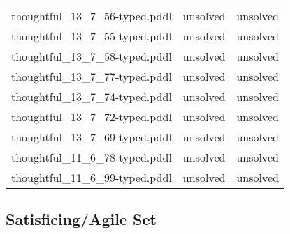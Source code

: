 \documentclass{article}
\begin{document}
\begin{center}
\begin{tabular}{r|r|r}
 thoughtful\_13\_7\_56-typed.pddl&unsolved&unsolved\\
 thoughtful\_13\_7\_55-typed.pddl&unsolved&unsolved\\
 thoughtful\_13\_7\_58-typed.pddl&unsolved&unsolved\\
 thoughtful\_13\_7\_77-typed.pddl&unsolved&unsolved\\
 thoughtful\_13\_7\_74-typed.pddl&unsolved&unsolved\\
 thoughtful\_13\_7\_72-typed.pddl&unsolved&unsolved\\
 thoughtful\_13\_7\_69-typed.pddl&unsolved&unsolved\\
 thoughtful\_11\_6\_78-typed.pddl&unsolved&unsolved\\
 thoughtful\_11\_6\_99-typed.pddl&unsolved&unsolved
                            \end{tabular}
                            \end{center}
                    
                    
                    \subsection*{Satisficing/Agile Set}
                    
\end{document}
